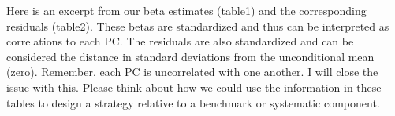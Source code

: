 \documentclass[11pt]{article}
\begin{document}
    Here is an excerpt from our beta estimates (table1) and the
corresponding residuals (table2). These betas are standardized and thus
can be interpreted as correlations to each PC. The residuals are also
standardized and can be considered the distance in standard deviations
from the unconditional mean (zero). Remember, each PC is uncorrelated
with one another. I will close the issue with this. Please think about
how we could use the information in these tables to design a strategy
relative to a benchmark or systematic component.


    
    
    
    
\end{document}
